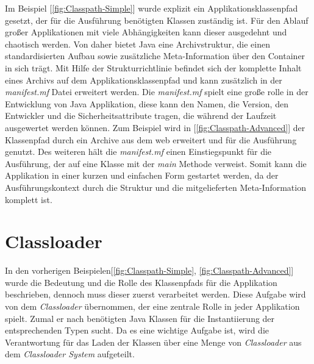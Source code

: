 Im Beispiel [\ref{fig:Classpath-Simple}] wurde explizit ein Applikationsklassenpfad gesetzt, der für die Ausführung benötigten Klassen zuständig ist. Für den Ablauf großer Applikationen mit viele Abhängigkeiten kann dieser ausgedehnt und chaotisch werden. Von daher bietet Java eine Archivstruktur, die einen standardisierten Aufbau sowie zusätzliche Meta-Information über den Container in sich trägt. Mit Hilfe der Strukturrichtlinie befindet sich der komplette Inhalt eines Archivs auf dem Applikationsklassenpfad und kann zusätzlich in der \textit{manifest.mf} Datei erweitert werden. Die \textit{manifest.mf} spielt eine große rolle in der Entwicklung von Java Applikation, diese kann den Namen, die Version, den Entwickler und die Sicherheitsattribute tragen, die während der Laufzeit ausgewertet werden können. Zum Beispiel wird in [\ref{fig:Classpath-Advanced}] der Klassenpfad durch ein Archive aus dem web erweitert und für die Ausführung genutzt. Des weiteren hält die \textit{manifest.mf} einen Einstiegspunkt für die Ausführung, der auf eine Klasse mit der \textit{main} Methode verweist. Somit kann die Applikation in einer kurzen und einfachen Form gestartet werden, da der Ausführungskontext durch die Struktur und die mitgelieferten Meta-Information komplett ist.

\section{Classloader}
\label{ssub:classloader}
In den vorherigen Beispielen[\ref{fig:Classpath-Simple}, \ref{fig:Classpath-Advanced}] wurde die Bedeutung und die Rolle des Klassenpfads für die Applikation beschrieben, dennoch muss dieser zuerst verarbeitet werden. Diese Aufgabe wird von dem \textit{Classloader} übernommen, der eine zentrale Rolle in jeder Applikation spielt. Zumal er nach benötigten Java Klassen für die Instantiierung der entsprechenden Typen sucht. Da es eine wichtige Aufgabe ist, wird die Verantwortung für das Laden der Klassen über eine Menge von \textit{Classloader} aus dem \textit{Classloader System} aufgeteilt. 

